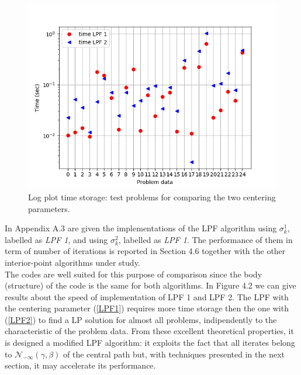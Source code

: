 \documentclass[a4paper,10 pt,titlepage,twoside]{book}
\theoremstyle{plain}
\theoremstyle{definition}
\theoremstyle{remark}
\begin{document}
\begin{figure}\label{fig:float}
\begin{center}
\includegraphics[width= 12 cm]{timeLPF12}\caption{Log plot time storage: test problems for comparing the two centering parameters.} 
\end{center}
\end{figure}
In Appendix A.3 are given the implementations of the LPF algorithm using $\sigma^{1}_{k}$, labelled as \textit{LPF 1}, and using $\sigma^{2}_{k}$, labelled as \textit{LPF 1}. The performance of them in term of number of iterations is reported in Section 4.6 together with the other interior-point algorithms under study.\\ The codes are well suited for this
purpose of comparison since the body (structure) of the code is the same for both algorithms. In Figure 4.2 we can give results about the speed of implementation of LPF 1 and LPF 2. The LPF with the centering parameter (\ref{LPF1}) requires more time storage then the one with (\ref{LPF2}) to find a LP solution for almost all problems, indipendently to the characteristic of the problem data. \newpage
From these excellent theoretical properties, it is designed a modified LPF algorithm: it exploits the fact that all iterates belong to $\mathcal{N}_{-\infty}(\gamma,\beta)$ of the central path but, with techniques presented in the next section, it may accelerate its performance. 
\end{document}

